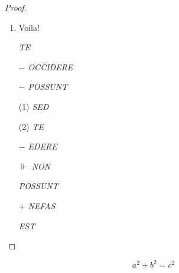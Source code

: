 \documentclass{article}
\newcommand{\assumption}[1]{\item #1}
\begin{document}
\begin{proof}

\begin{enumerate}
	\assumption{Voila!}
	\item[\textbullet] \emph{TE}
	\item[$-$] \emph{OCCIDERE}
	\item[$-$] \emph{POSSUNT}
	\item[(1)] \emph{SED}
	\item[(2)] \emph{TE}
	\item[$-$] \emph{EDERE}
	\item[$\Vdash$] \emph{NON}
	\item[\lbrack3\rbrack] \emph{POSSUNT}
	\item[$+$] \emph{NEFAS}
	\item[\lbrack4\rbrack] \emph{EST}
\end{enumerate}
\end{proof}

\begin{displaymath}
  a^2 + b^2 = c^2
\end{displaymath}
\end{document}
